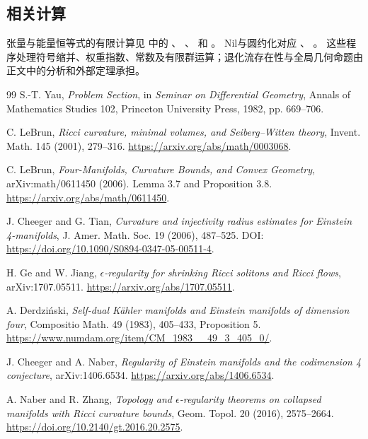 \documentclass[UTF8,a4paper,11pt,fontset=fandol]{ctexart}
\numberwithin{equation}{section}
\theoremstyle{definition}
\begin{document}
\subsection{相关计算}
张量与能量恒等式的有限计算见
 中的
、
、
 和
。
Nil与圆约化对应
、
。
这些程序处理符号缩并、权重指数、常数及有限群运算；退化流存在性与全局几何命题由正文中的分析和外部定理承担。

\begin{thebibliography}{99}
 S.-T. Yau, \emph{Problem Section}, in \emph{Seminar on Differential Geometry}, Annals of Mathematics Studies 102, Princeton University Press, 1982, pp. 669--706.

 C. LeBrun, \emph{Ricci curvature, minimal volumes, and Seiberg--Witten theory}, Invent. Math. 145 (2001), 279--316. \url{https://arxiv.org/abs/math/0003068}.

 C. LeBrun, \emph{Four-Manifolds, Curvature Bounds, and Convex Geometry}, arXiv:math/0611450 (2006). Lemma 3.7 and Proposition 3.8. \url{https://arxiv.org/abs/math/0611450}.

 J. Cheeger and G. Tian, \emph{Curvature and injectivity radius estimates for Einstein 4-manifolds}, J. Amer. Math. Soc. 19 (2006), 487--525. DOI: \url{https://doi.org/10.1090/S0894-0347-05-00511-4}.

 H. Ge and W. Jiang, \emph{$\epsilon$-regularity for shrinking Ricci solitons and Ricci flows}, arXiv:1707.05511. \url{https://arxiv.org/abs/1707.05511}.

 A. Derdzi\'nski, \emph{Self-dual K\"ahler manifolds and Einstein manifolds of dimension four}, Compositio Math. 49 (1983), 405--433, Proposition 5. \url{https://www.numdam.org/item/CM_1983__49_3_405_0/}.

 J. Cheeger and A. Naber, \emph{Regularity of Einstein manifolds and the codimension 4 conjecture}, arXiv:1406.6534. \url{https://arxiv.org/abs/1406.6534}.

 A. Naber and R. Zhang, \emph{Topology and $\epsilon$-regularity theorems on collapsed manifolds with Ricci curvature bounds}, Geom. Topol. 20 (2016), 2575--2664. \url{https://doi.org/10.2140/gt.2016.20.2575}.


\end{thebibliography}
\end{document}
